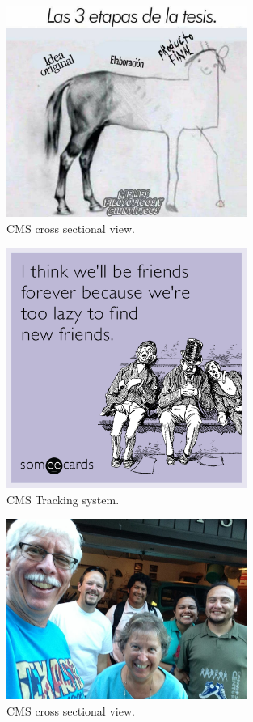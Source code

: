 \begin{figure}[!h]
  \centering
  \includegraphics[width=0.7\textwidth]{../images/ch2/10}
  \caption[CMS cross sectional view]{CMS cross sectional view.}\label{fig:cms_layout}
\end{figure}


\begin{figure}[!h]
  \centering
  \includegraphics[width=0.7\textwidth]{../images/ch2/3}
  \caption[CMS Tracking system.]{CMS Tracking system.}\label{fig:cms_layout}
\end{figure}


\begin{figure}[!h]
  \centering
  \includegraphics[width=0.7\textwidth]{../images/ch2/12}
  \caption[CMS cross sectional view]{CMS cross sectional view.}\label{fig:cms_cross}
\end{figure}


